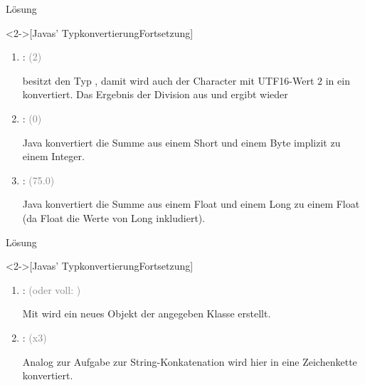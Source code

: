 \begin{frame}[c]{Lösung}
    \addtocounter{solve}{-1}%
    \begin{solve}<2->[Javas' Typkonvertierung\hfill{Fortsetzung}]
\pause\begin{enumerate}[<+(1)->]
    \widei
    \setcounter{enumi}{3}
    \item {}:  \textcolor{gray}{(2)}\pause\par
     besitzt den Typ , damit wird auch der Character mit UTF16-Wert \(2\) in ein  konvertiert. Das Ergebnis der Division aus  und  ergibt wieder 
    \item {}:  \textcolor{gray}{(0)}\pause\par
    Java konvertiert die Summe aus einem Short und einem Byte implizit zu einem Integer.
    \item {}:  \textcolor{gray}{(75.0)}\pause\par
    Java konvertiert die Summe aus einem Float und einem Long zu einem Float (da Float die Werte von Long inkludiert).
\end{enumerate}
    \end{solve}
\end{frame}

\begin{frame}[c]{Lösung}
    \addtocounter{solve}{-1}%
    \begin{solve}<2->[Javas' Typkonvertierung\hfill{Fortsetzung}]
\pause\begin{enumerate}[<+(1)->]
    \widei
    \setcounter{enumi}{6}
    \item {}:  \textcolor{gray}{(oder voll: )}\pause\par
    Mit  wird ein neues Objekt der angegeben Klasse erstellt.
    \item {}:  \textcolor{gray}{(x3)}\pause\par
    Analog zur Aufgabe zur String-Konkatenation wird hier  in eine Zeichenkette konvertiert.
\end{enumerate}
    \end{solve}
\end{frame}
\fi
